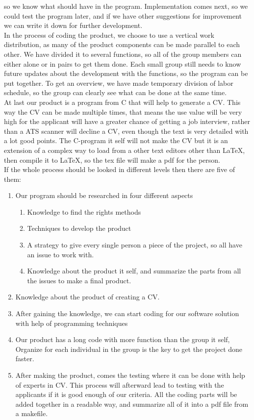 so we know what should have in the program. Implementation comes next, so we could test the program later, 
and if we have other suggestions for improvement we can write it down for further development.\\

In the process of coding the product, we choose to use a vertical work distribution, as many of the product
components can be made parallel to each other. We have divided it to several functions, 
so all of the group members can either alone or in pairs to get them done.
Each small group still needs to know future updates about the development with the functions, so the program can be put together.
To get an overview, we have made temporary division of labor
schedule, so the group can clearly see what can be done at the same time. \\

At last our product is a program from C that will help to generate a CV. This way the CV can be made multiple times,
that means the use value will be very high for the applicant will have a greater chance of getting a job interview,
rather than a ATS scanner will decline a CV, even though the text is very detailed with a lot good points.
The C-program it self will not make the CV but it is an extension of a complex way to load from a other text editors
other than LaTeX, then compile it to LaTeX, so the tex file will make a pdf for the person.\\

If the whole process should be looked in different levels then there are five of them:

\begin{enumerate}
  \item Our program should be researched in four different aspects 
  \begin{enumerate}
    \item Knowledge to find the rights methods 
    \item Techniques to develop the product
    \item A strategy to give every single person a piece of the project, so all have an issue to work with.
    \item Knowledge about the product it self, and summarize the parts from all the issues to make a final product.
  \end{enumerate}
  \item Knowledge about the product of creating a CV.
  \item After gaining the knowledge,
        we can start coding for our software solution with help of programming techniques
  \item Our product has a long code with more function than the group it self, 
        Organize for each individual in the group is the key to get the project done faster.
  \item After making the product, comes the testing where it can be done with help of experts in CV.
        This process will afterward lead to testing with the applicants if it is good enough of our criteria.
        All the coding parts will be added together in a readable way, and summarize all of it into a pdf file from a makefile.
\end{enumerate}